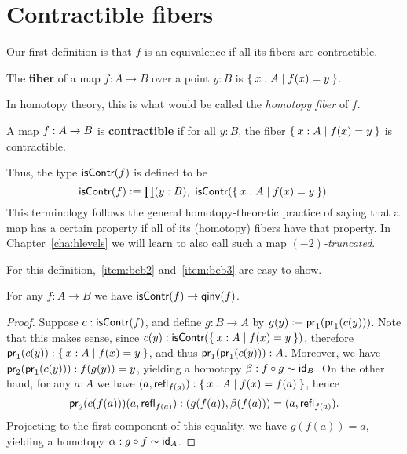 \section{Contractible fibers}
\label{sec:contrf}

Our first definition is that $f$ is an equivalence if all its fibers are contractible.

\begin{defn}
  The \textbf{fiber} of a map $f:A\to B$ over a point $y:B$ is $\setof{x:A | f(x) = y}$.
\end{defn}

In homotopy theory, this is what would be called the \emph{homotopy fiber} of $f$.

\begin{defn}\label{defn:equivalence}
  A map $f:A\ra B$ is \textbf{contractible} if for all $y:B$, the fiber $\setof{x:A | f(x) = y}$ is contractible.
\end{defn}

Thus, the type $\iscontr(f)$ is defined to be
\begin{equation}
  \iscontr(f) \defeq \prd{y:B} \iscontr (\setof{x:A | f(x) = y}).\label{eq:iscontrf}
\end{equation}
This terminology follows the general homotopy-theoretic practice of saying that a map has a certain property if all of its (homotopy) fibers have that property.
In Chapter~\ref{cha:hlevels} we will learn to also call such a map \emph{$(-2)$-truncated}.

For this definition,~\ref{item:beb2} and~\ref{item:beb3} are easy to show.

\begin{lem}
  For any $f:A\to B$ we have $\iscontr(f)\to\qinv(f)$.
\end{lem}
\begin{proof}
  Suppose $c:\iscontr(f)$, and define $g:B\to A$ by $g(y)\defeq \proj1(\proj1(c(y)))$.
  Note that this makes sense, since $c(y):\iscontr (\setof{x:A | f(x) = y})$, therefore $\proj1(c(y)):\setof{x:A | f(x) = y}$, and thus $\proj1(\proj1(c(y))) : A$.
  Moreover, we have $\proj2(\proj1(c(y))) : f(g(y))=y$, yielding a homotopy $\beta:f\circ g\htpy \idfunc[B]$.
  On the other hand, for any $a:A$ we have $(a,\refl{f(a)}) : \setof{x:A | f(x) = f(a)}$, hence
  \[\proj2(c(f(a)))(a,\refl{f(a)}) : (g(f(a)),\beta(f(a))) = (a,\refl{f(a)}).\]
  Projecting to the first component of this equality, we have $g(f(a))=a$, yielding a homotopy $\alpha:g\circ f \htpy \idfunc[A]$.
\end{proof}

